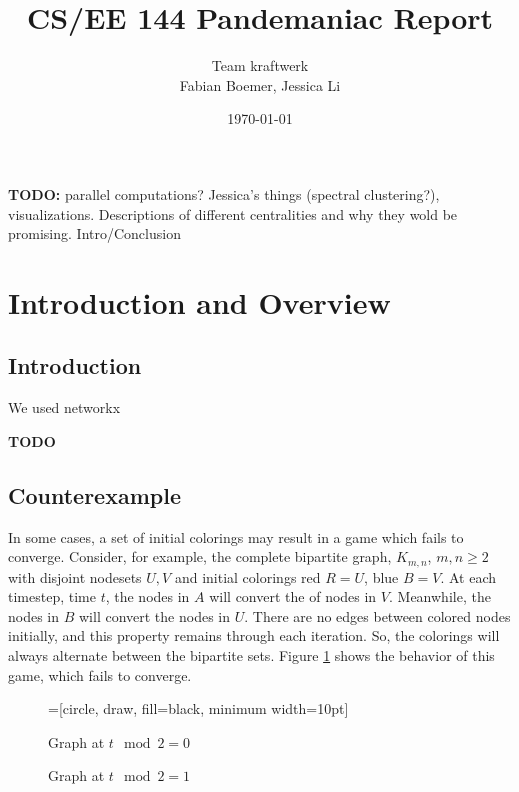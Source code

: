 \documentclass[letterpaper, 11pt]{article}
\begin{document}
\title{CS/EE 144 Pandemaniac Report}
\author{Team kraftwerk \\Fabian Boemer, Jessica Li}
\date{\today}
\maketitle


\textbf{TODO:}
parallel computations? Jessica's things (spectral clustering?), visualizations. Descriptions of different centralities and why they wold be promising. Intro/Conclusion


\section{Introduction and Overview}
\subsection{Introduction}
We used networkx \cite{networkx}

\textbf{TODO}

\subsection{Counterexample}
In some cases, a set of initial colorings may result in a game which fails to converge. Consider, for example, the complete bipartite graph, $K_{m,n}$, $m,n \geq 2$ with disjoint nodesets $U, V$ and initial colorings red $R= U$, blue $B=V$. At each timestep, time $t$, the nodes in $A$ will convert the of nodes in $V$. Meanwhile, the nodes in $B$ will convert the nodes in $U$. There are no edges between colored nodes initially, and this property remains through each iteration. So, the colorings will always alternate between the bipartite sets. Figure \ref{fig:converge} shows the behavior of this game, which fails to converge.
  
\begin{figure}[h!]   
\begin{center}
=[circle, draw, fill=black, minimum width=10pt]

\caption{Graph at $t\mod 2 = 0$}

\caption{Graph at $t\mod 2 = 1$}
\label{fig:converge}
\end{center}

\end{figure}
\end{document}

